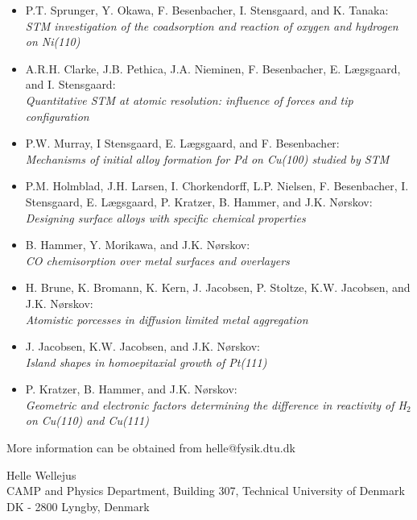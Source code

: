{\begin{itemize}
\item
P.T. Sprunger, Y. Okawa, F. Besenbacher, I. Stensgaard, and K. Tanaka: \\
{\em STM investigation of the coadsorption and reaction of oxygen and hydrogen on Ni(110)} 

\item
A.R.H. Clarke, J.B. Pethica, J.A. Nieminen, F. Besenbacher, E. L{\ae}gsgaard, and I. Stensgaard:\\
{\em Quantitative STM at atomic resolution: influence of forces and tip configuration} 

\item
P.W. Murray, I Stensgaard, E. L{\ae}gsgaard, and F. Besenbacher: \\
{\em Mechanisms of initial alloy formation for Pd on Cu(100) studied by STM} 

\item
P.M. Holmblad, J.H. Larsen, I. Chorkendorff, L.P. Nielsen, F. Besenbacher, I. Stensgaard, E. L{\ae}gsgaard, P. Kratzer, B. Hammer, and J.K. N{\o}rskov: \\
{\em Designing surface alloys with specific chemical properties} 

\item
B. Hammer, Y. Morikawa, and J.K. N{\o}rskov: \\
{\em CO chemisorption over metal surfaces and overlayers} 

\item
H. Brune, K. Bromann, K. Kern, J. Jacobsen, P. Stoltze, K.W. Jacobsen, and J.K. N{\o}rskov:\\
{\em Atomistic porcesses in diffusion limited metal aggregation} 

\item
J. Jacobsen, K.W. Jacobsen, and J.K. N{\o}rskov:\\
{\em Island shapes in homoepitaxial growth of Pt(111)} 
 
\item
P. Kratzer, B. Hammer, and J.K. N{\o}rskov:\\
{\em Geometric and electronic factors determining the difference in reactivity of H$_2$ on Cu(110) and Cu(111)} 

\end{itemize}


\bigskip
\noindent
{\large More information can be obtained from helle@fysik.dtu.dk}

\bigskip
\noindent
Helle Wellejus\\
CAMP and Physics Department, Building 307, Technical University of Denmark\\
DK - 2800 Lyngby, Denmark

}
